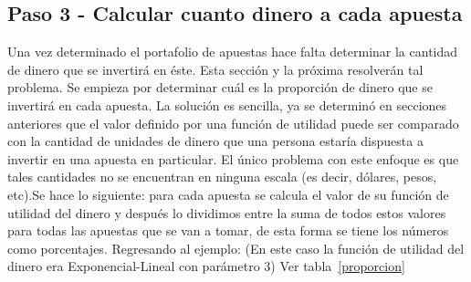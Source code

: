\begin{table}[ht]
\centering
{}
\caption{Escogiendo apuestas que vale la pena realizar}
\label{seleccion}
\end{table}

\subsection{Paso 3 - Calcular cuanto dinero a cada apuesta}
\label{sec:paso-3}

Una vez determinado el portafolio de apuestas hace falta determinar la cantidad de dinero que se invertirá en éste. Esta sección y la próxima resolverán tal problema.
 Se empieza por determinar cuál es la proporción de dinero que se invertirá en cada apuesta. La solución es sencilla, ya se determinó en secciones anteriores que el valor definido por una función de utilidad puede ser comparado con la cantidad de unidades de dinero que una persona estaría dispuesta a invertir en una apuesta en particular. El único problema con este enfoque es que tales cantidades no se encuentran en ninguna escala (es decir, dólares, pesos, etc).Se hace lo siguiente: para cada apuesta se calcula el valor de su función de utilidad del dinero y después lo dividimos entre la suma de todos estos valores para todas las apuestas que se van a tomar, de esta forma se tiene los números como porcentajes.
 Regresando al ejemplo: (En este caso la función de utilidad del dinero era Exponencial-Lineal con parámetro 3)
Ver tabla~\ref{proporcion}

